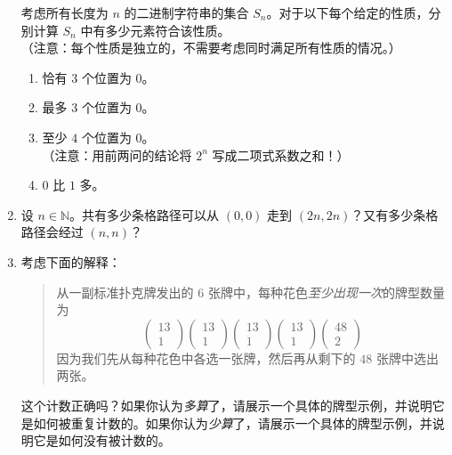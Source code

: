 \begin{enumerate}[label=(\arabic*)]
          考虑所有长度为 $n$ 的二进制字符串的集合 $S_n$。对于以下每个给定的性质，分别计算 $S_n$ 中有多少元素符合该性质。\\
          （注意：每个性质是独立的，不需要考虑同时满足所有性质的情况。）
          \begin{enumerate}[label=(\alph*)]
              \item 恰有 $3$ 个位置为 $0$。
              \item 最多 $3$ 个位置为 $0$。
              \item 至少 $4$ 个位置为 $0$。\\
                    （注意：用前两问的结论将 $2^n$ 写成二项式系数之和！）
              \item $0$ 比 $1$ 多。
          \end{enumerate}
    \item 设 $n \in \mathbb{N}$。共有多少条格路径可以从 $(0, 0)$ 走到 $(2n, 2n)$？又有多少条格路径会经过 $(n, n)$？
    \item 考虑下面的解释：
          \begin{quote}
              从一副标准扑克牌发出的 $6$ 张牌中，每种花色\emph{至少出现一次}的牌型数量为
              \[\begin{pmatrix}13\\1\end{pmatrix}\begin{pmatrix}13\\1\end{pmatrix}\begin{pmatrix}13\\1\end{pmatrix}\begin{pmatrix}13\\1\end{pmatrix}\begin{pmatrix}48\\2\end{pmatrix}\]
              因为我们先从每种花色中各选一张牌，然后再从剩下的 $48$ 张牌中选出两张。
          \end{quote}
          这个计数正确吗？如果你认为\emph{多算}了，请展示一个具体的牌型示例，并说明它是如何被重复计数的。如果你认为\emph{少算}了，请展示一个具体的牌型示例，并说明它是如何没有被计数的。
\end{enumerate}